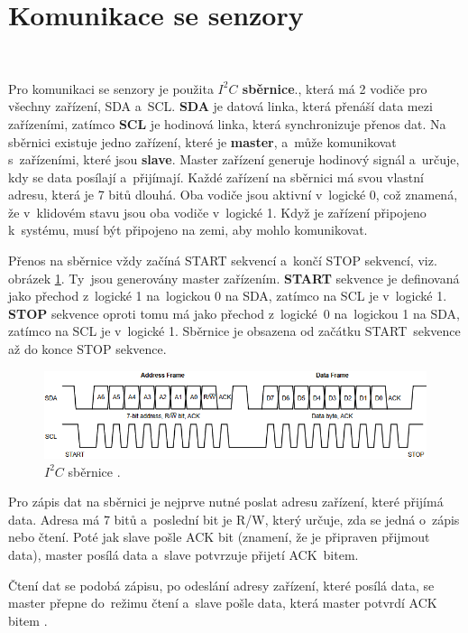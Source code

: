 \section{Komunikace se senzory}\

Pro komunikaci se senzory je použita \textbf{$I^2C$ sběrnice}., která má 2
vodiče pro všechny zařízení, SDA a~SCL. \textbf{SDA} je datová linka, která
přenáší data mezi zařízeními, zatímco \textbf{SCL} je hodinová linka, která
synchronizuje přenos dat. Na sběrnici existuje jedno zařízení, které je
\textbf{master}, a~může komunikovat s~zařízeními, které jsou \textbf{slave}. Master
zařízení generuje hodinový signál a~určuje, kdy se data posílají a~přijímají. Každé
zařízení na sběrnici má svou vlastní adresu, která je 7 bitů dlouhá. Oba vodiče jsou
aktivní v~logické 0, což znamená, že v~klidovém stavu jsou oba vodiče v~logické 1.
Když je zařízení připojeno k~systému, musí být připojeno na zemi, aby mohlo
komunikovat.

Přenos na sběrnice vždy začíná START sekvencí a~končí STOP sekvencí, viz. obrázek
\ref{fig:I2C_FRAME}. Ty~jsou generovány master zařízením. \textbf{START} sekvence je
definovaná jako přechod z~logické 1 na~logickou 0 na SDA, zatímco na SCL je
v~logické 1. \textbf{STOP} sekvence oproti tomu má jako přechod z~logické~0
na~logickou 1 na SDA, zatímco na SCL je v~logické 1. Sběrnice je obsazena od začátku
START~sekvence až do konce STOP sekvence.

\begin{figure}[!h]
    \centering
    \includegraphics[width = .9\linewidth]{Figures/I2C_FRAME.png}
    \caption{$I^2C$ sběrnice \cite{I2C}.}
    \label{fig:I2C_FRAME}
\end{figure}

Pro zápis dat na sběrnici je nejprve nutné poslat adresu zařízení, které přijímá
data. Adresa má 7 bitů a~poslední bit je R/W, který určuje, zda se jedná o~zápis
nebo čtení. Poté jak slave pošle ACK bit (znamení, že je připraven přijmout data),
master posílá data a~slave potvrzuje přijetí ACK~bitem.

Čtení dat se podobá zápisu, po odeslání adresy zařízení, které posílá data, se
master přepne do~režimu čtení a~slave pošle data, která master potvrdí ACK
bitem \cite{I2C}.

